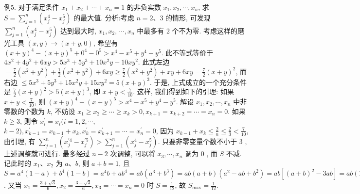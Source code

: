 例5. 对于满足条件 $x_1+x_2+\cdots+x_n=1$ 的非负实数 $x_1, x_2, \cdots, x_n$, 求 $S=\sum_{j=1}^n\left(x_j^4-x_j^5\right)$ 的最大值.
分析:考虑 $n=2 、 3$ 的情形, 可发现 $\sum_{j=1}^n\left(x_j^4-x_j^5\right)$ 达到最大时, $x_1, x_2$, $\cdots, x_n$ 中最多有 2 个不为零.
考虑这样的磨光工具 $(x, y) \rightarrow(x+y, 0)$, 希望有 $(x+y)^4-(x+y)^5+0^4-0^5>x^4-x^5+y^4-y^5$. 此不等式等价于 $4 x^2+ 4 y^2+6 x y>5 x^3+5 y^3+10 x^2 y+10 x y^2$. 此式左边 $=\frac{7}{2}\left(x^2+y^2\right)+\frac{1}{2}\left(x^2+\right. \left.y^2\right)+6 x y \geqslant \frac{7}{2}\left(x^2+y^2\right)+x y+6 x y=\frac{7}{2}(x+y)^2$, 而右边 $\leqslant 5 x^3+5 y^3+ 15 x^2 y+15 x y^2=5(x+y)^3$. 于是, 上式成立的一个充分条件是 $\frac{7}{2}(x+y)^2> 5(x+y)^3$, 即 $x+y<\frac{7}{10}$. 这样, 我们得到如下的引理: 如果 $x+y<\frac{7}{10}$, 则 $(x+y)^4-(x+y)^5>x^4-x^5+y^4-y^5$.
解设 $x_1, x_2, \cdots, x_n$ 中非零数的个数为 $k$, 不妨设 $x_1 \geqslant x_2 \geqslant \cdots \geqslant x_k>0, x_{k+1}=x_{k+2}=\cdots=x_n=0$. 如果 $k \geqslant 3$, 则令 $x_i^{\prime}=x_i(i=1,2, \cdots$, $k-2), x_{k-1}^{\prime}=x_{k-1}+x_k, x_k^{\prime}=x_{k+1}^{\prime}=\cdots=x_n^{\prime}=0$, 因为 $x_{k-1}+x_k \leqslant \frac{2}{n} \leqslant \frac{2}{3}<\frac{7}{10}$, 由引理, 有 $\sum_{j=1}^n\left(x_j^{\prime 4}-x_j^{\prime 5}\right)>\sum_{j=1}^n\left(x_j^4-x_j^5\right)$. 只要非零变量个数不小于 3 , 上述调整就可进行.
最多经过 $n-2$ 次调整, 可以将 $x_3, \cdots, x_n$ 调为 0 , 而 $S$ 不减.
记此时的 $x_1 、 x_2$ 为 $a 、 b$, 则 $a+b=1$, 且 $S=a^4(1-a)+b^4(1-b)=a^4 b+ a b^4=a b\left(a^3+b^3\right)=a b(a+b)\left(a^2-a b+b^2\right)=a b\left[(a+b)^2-3 a b\right]=a b(1- 3 a b)=\frac{1}{3}(3 a b)(1-3 a b) \leqslant \frac{1}{3} \times \frac{1}{4}=\frac{1}{12}$.
又当 $x_1=\frac{3+\sqrt{3}}{6}, x_2=\frac{3-\sqrt{3}}{6}, x_3=\cdots=x_n=0$ 时 $S=\frac{1}{12}$, 故 $S_{\max }=\frac{1}{12}$.



